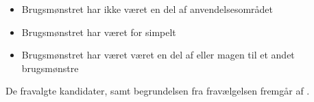 \begin{itemize}[noitemsep]
\item Brugsmønstret har ikke været en del af anvendelsesområdet
\item Brugsmønstret har været for simpelt
\item Brugsmønstret har været været en del af eller magen til et andet brugsmønstre
\end{itemize}

De fravalgte kandidater, samt begrundelsen fra fravælgelsen fremgår af .


